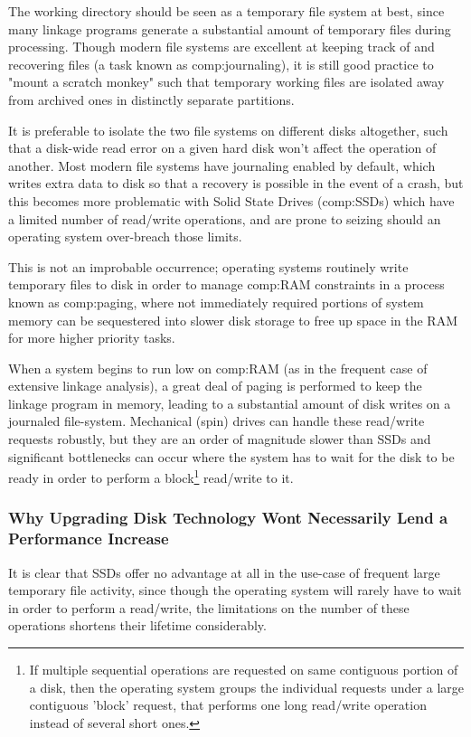 The working directory should be seen as a temporary file system at best, since many linkage programs generate a substantial amount of temporary files during processing. Though modern file systems are excellent at keeping track of and recovering files (a task known as \gls{comp:journaling}), it is still good practice to "mount a scratch monkey" such that temporary working files are isolated away from archived ones in distinctly separate partitions. 

It is preferable to isolate the two file systems on different disks altogether, such that a disk-wide read error on a given hard disk won't affect the operation of another. Most modern file systems have journaling enabled by default, which writes extra data to disk so that a recovery is possible in the event of a crash, but this becomes more problematic with Solid State Drives (\gls{comp:SSD}s) which have a limited number of read/write operations, and are prone to seizing should an operating system over-breach those limits.

This is not an improbable occurrence; operating systems routinely write temporary files to disk in order to manage \gls{comp:RAM} constraints in a process known as \gls{comp:paging}, where not immediately required portions of system memory can be sequestered into slower disk storage to free up space in the RAM for more higher priority tasks.

When a system begins to run low on \gls{comp:RAM} (as in the frequent case of extensive linkage analysis), a great deal of paging is performed to keep the linkage program in memory, leading to a substantial amount of disk writes on a journaled file-system. Mechanical (spin) drives can handle these read/write requests robustly, but they are an order of magnitude slower than SSDs and significant bottlenecks can occur where the system has to wait for the disk to be ready in order to perform a block\footnote{If multiple sequential operations are requested on same contiguous portion of a disk, then the operating system groups the individual requests under a large contiguous 'block' request, that performs one long read/write operation instead of several short ones.}    read/write to it.


\subsubsection{Why Upgrading Disk Technology Wont Necessarily Lend a Performance Increase}
It is clear that SSDs offer no advantage at all in the use-case of frequent large temporary file activity, since though the operating system will rarely have to wait in order to perform a read/write, the limitations on the number of these operations shortens their lifetime considerably.

